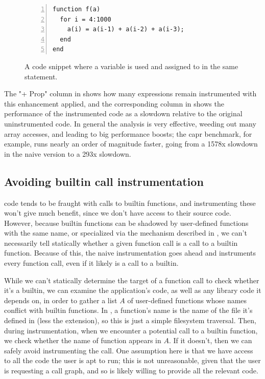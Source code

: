\begin{figure}[htbp]
\begin{lstlisting}[numbers=left]
function f(a)
  for i = 4:1000
    a(i) = a(i-1) + a(i-2) + a(i-3);
  end
end
\end{lstlisting}
\caption{A code snippet where a variable is used and assigned to in the same statement.}
\label{Fig:OutSetNotInSet}
\end{figure}

The "+ Prop" column in 
shows how many expressions remain instrumented with this enhancement applied,
and the corresponding column in  shows
the performance of the instrumented code as a slowdown relative to the
original uninstrumented code. In general the analysis is very effective,
weeding out many array accesses, and leading to big performance boosts; the
capr benchmark, for example, runs nearly an order of magnitude faster, going
from a 1578x slowdown in the naive version to a 293x slowdown.

\subsection{Avoiding builtin call instrumentation}

\matlab code tends to be fraught with calls to builtin functions, and
instrumenting these won't give much benefit, since we don't have access to
their source code. However, because \matlab builtin functions can be shadowed
by user-defined functions with the same name, or specialized via the mechanism
described in , we can't necessarily tell statically
whether a given function call is a call to a builtin function. Because of this,
the naive instrumentation goes ahead and instruments every function call, even
if it likely is a call to a builtin.

While we can't statically determine the target of a function call to check
whether it's a builtin, we can examine the application's code, as well as any
library code it depends on, in order to gather a list $A$ of user-defined
functions whose names conflict with builtin functions. In \matlab, a function's
name is the name of the file it's defined in (less the extension), so this is
just a simple filesystem traversal. Then, during instrumentation, when we
encounter a potential call to a builtin function, we check whether the name of
function appears in $A$. If it doesn't, then we can safely avoid instrumenting
the call. One assumption here is that we have access to all the code the user
is apt to run; this is not unreasonable, given that the user is requesting a
call graph, and so is likely willing to provide all the relevant code.

